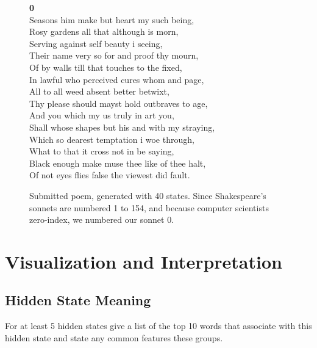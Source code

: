 \begin{figure}[h!]
	\begin{center}
{\bf 0}\\
\noindent Seasons him make but heart my such being,\\
Rosy gardens all that although is morn,\\
Serving against self beauty i seeing,\\
Their name very so for and proof thy mourn,\\
Of by walls till that touches to the fixed,\\
In lawful who perceived cures whom and page,\\
All to all weed absent better betwixt,\\
Thy please should mayst hold outbraves to age,\\
And you which my us truly in art you,\\
Shall whose shapes but his and with my straying,\\
Which so dearest temptation i woe through,\\
What to that it cross not in be saying,\\
Black enough make muse thee like of thee halt,\\
Of not eyes flies false the viewest did fault.
	\end{center}
	\caption{
		Submitted poem, generated with 40 states.  Since Shakespeare's sonnets are numbered 1 to 154, and because computer scientists zero-index, we numbered our sonnet 0.  
	}
\end{figure}

\section{Visualization and Interpretation}
\subsection{Hidden State Meaning}
For at least 5 hidden states give a list of the top 10 words that associate with this hidden state and state any common features these groups.

